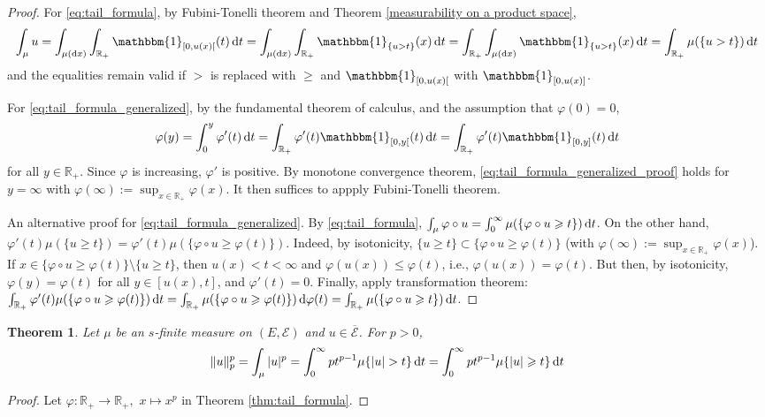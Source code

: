 \documentclass[11pt, a4paper, openany]{book}
\newtheorem{thm}{Theorem}\newtheorem{lem}{Lemma}\newtheorem{crl}{Corollary}
\theoremstyle{definition}
\newcommand{\mf}[1]{\overline{\mathscr{#1}}}
\begin{document}
    \begin{proof}
        For \eqref{eq:tail_formula}, by Fubini-Tonelli theorem and Theorem \ref{measurability on a product space},
        \[
            \int_\mu u=\int_{\mu(\odif x)}\int_{\mathbb{R}_+}\mathbbm{1}_{[0,u(x)[}(t)\odif t=\int_{\mu(\odif x)}\int_{\mathbb{R}_+}\mathbbm{1}_{\{u>t\}}(x)\odif t=\int_{\mathbb{R}_+} \int_{\mu(\odif x)}\mathbbm{1}_{\{u>t\}}(x)\odif t=\int_{\mathbb{R}_+}\mu(\{u>t\})\odif t
        \]
        and the equalities remain valid if $>$ is replaced with $\geqslant$ and $\mathbbm{1}_{[0,u(x)[}$ with $\mathbbm{1}_{[0,u(x)]}$.

        For \eqref{eq:tail_formula_generalized}, by the fundamental theorem of calculus, and the assumption that $\varphi(0)=0$,
        \begin{equation}\label{eq:tail_formula_generalized_proof}
            \varphi(y)=\int_0^{y}\varphi'(t)\odif t=\int_{\mathbb{R}_+} \varphi'(t)\mathbbm{1}_{[0,y[}(t)\odif t=\int_{\mathbb{R}_+} \varphi'(t)\mathbbm{1}_{[0,y]}(t)\odif t
        \end{equation}
        for all $y\in\mathbb{R}_+$. Since $\varphi$ is increasing, $\varphi'$ is positive. By monotone convergence theorem, \eqref{eq:tail_formula_generalized_proof} holds for $y=\infty$ with $\varphi(\infty):=\sup_{x\in\mathbb{R}_+}\varphi(x)$. It then suffices to appply Fubini-Tonelli theorem.

        An alternative proof for \eqref{eq:tail_formula_generalized}. By \eqref{eq:tail_formula}, $\int_\mu \varphi\circ u=\int_0^\infty \mu(\{\varphi \circ u\geqslant t\})\odif t$. On the other hand, $\varphi'(t)\mu(\{u\geqslant t\})=\varphi'(t)\mu(\{\varphi\circ u\geqslant \varphi(t)\})$. Indeed, by isotonicity, $\{u\geqslant t\}\subset\{\varphi\circ u\geqslant \varphi(t)\}$ (with $\varphi(\infty):=\sup_{x\in\mathbb{R}_+}\varphi(x)$). If $x\in \{\varphi\circ u\geqslant \varphi(t)\}\setminus \{u\geqslant t\}$, then $u(x)<t<\infty$ and $\varphi(u(x))\leqslant \varphi(t)$, i.e., $\varphi(u(x))=\varphi(t)$. But then, by isotonicity, $\varphi(y)=\varphi(t)$ for all $y\in [u(x),t]$, and $\varphi'(t)=0$. Finally, apply transformation theorem: $\int_{\mathbb{R}_+} \varphi'(t)\mu(\{\varphi\circ u\geqslant \varphi(t)\})\odif t=\int_{\mathbb{R}_+} \mu(\{\varphi\circ u\geqslant \varphi(t)\}) \odif\varphi(t)=\int_{\mathbb{R}_+}\mu(\{\varphi\circ u\geqslant t\})\odif t$.
    \end{proof}
    \begin{thm}\label{tail formula for Lp norm}
        Let $\mu$ be an $s$-finite measure on $(E,\mathscr{E})$ and $u\in\mf{E}$. For $p>0$,
        \[\|u\|_p^p=\int_\mu |u|^p=\int_0^\infty pt^{p-1}\mu\{|u|> t\}\odif t=\int_0^\infty pt^{p-1}\mu\{|u|\geqslant t\}\odif t
        \]
    \end{thm}
    \begin{proof}
        Let $\varphi:\mathbb{R}_+\rightarrow\mathbb{R}_+,\,\,x\mapsto x^p$ in Theorem \ref{thm:tail_formula}.
    \end{proof}
\end{document}
